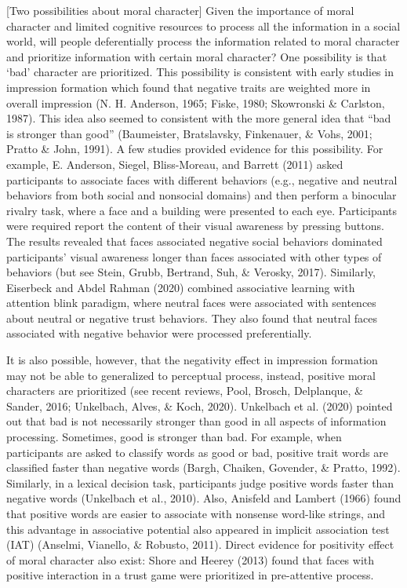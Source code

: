 \documentclass[
  man]{apa6}
\begin{document}
{[}Two possibilities about moral character{]}
Given the importance of moral character and limited cognitive resources to process all the information in a social world, will people deferentially process the information related to moral character and prioritize information with certain moral character? One possibility is that `bad' character are prioritized. This possibility is consistent with early studies in impression formation which found that negative traits are weighted more in overall impression (N. H. Anderson, 1965; Fiske, 1980; Skowronski \& Carlston, 1987). This idea also seemed to consistent with the more general idea that ``bad is stronger than good'' (Baumeister, Bratslavsky, Finkenauer, \& Vohs, 2001; Pratto \& John, 1991). A few studies provided evidence for this possibility. For example, E. Anderson, Siegel, Bliss-Moreau, and Barrett (2011) asked participants to associate faces with different behaviors (e.g., negative and neutral behaviors from both social and nonsocial domains) and then perform a binocular rivalry task, where a face and a building were presented to each eye. Participants were required report the content of their visual awareness by pressing buttons. The results revealed that faces associated negative social behaviors dominated participants' visual awareness longer than faces associated with other types of behaviors (but see Stein, Grubb, Bertrand, Suh, \& Verosky, 2017). Similarly, Eiserbeck and Abdel Rahman (2020) combined associative learning with attention blink paradigm, where neutral faces were associated with sentences about neutral or negative trust behaviors. They also found that neutral faces associated with negative behavior were processed preferentially.

It is also possible, however, that the negativity effect in impression formation may not be able to generalized to perceptual process, instead, positive moral characters are prioritized (see recent reviews, Pool, Brosch, Delplanque, \& Sander, 2016; Unkelbach, Alves, \& Koch, 2020). Unkelbach et al. (2020) pointed out that bad is not necessarily stronger than good in all aspects of information processing. Sometimes, good is stronger than bad. For example, when participants are asked to classify words as good or bad, positive trait words are classified faster than negative words (Bargh, Chaiken, Govender, \& Pratto, 1992). Similarly, in a lexical decision task, participants judge positive words faster than negative words (Unkelbach et al., 2010). Also, Anisfeld and Lambert (1966) found that positive words are easier to associate with nonsense word-like strings, and this advantage in associative potential also appeared in implicit association test (IAT) (Anselmi, Vianello, \& Robusto, 2011). Direct evidence for positivity effect of moral character also exist: Shore and Heerey (2013) found that faces with positive interaction in a trust game were prioritized in pre-attentive process.
\end{document}
